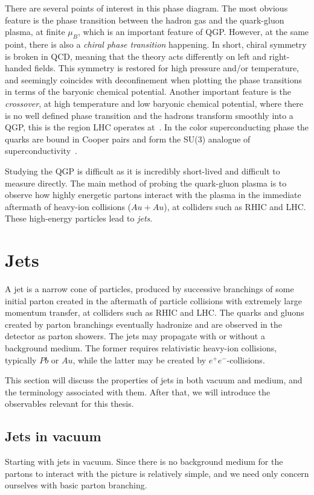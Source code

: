\documentclass[main.tex]{subfiles}
\begin{document}
There are several points of interest in this phase diagram. The most obvious feature is the phase transition between the hadron gas and the quark-gluon plasma, at finite \(\mu_B\), which is an important feature of QGP. However, at the same point, there is also a \emph{chiral phase transition} happening. In short, chiral symmetry is broken in QCD, meaning that the theory acts differently on left and right-handed fields. This symmetry is restored for high pressure and/or temperature, and seemingly coincides with deconfinement when plotting the phase transitions in terms of the baryonic chemical potential. Another important feature is the \emph{crossover}, at high temperature and low baryonic chemical potential, where there is no well defined phase transition and the hadrons transform smoothly into a QGP, this is the region LHC operates at~\cite{florkowski2010phenomenology}. In the color superconducting phase the quarks are bound in Cooper pairs and form the SU(3) analogue of superconductivity~\cite{Fischer_2019}.

Studying the QGP is difficult as it is incredibly short-lived and difficult to measure directly. The main method of probing the quark-gluon plasma is to observe how highly energetic partons interact with the plasma in the immediate aftermath of heavy-ion collisions (\(Au+Au\)), at colliders such as RHIC and LHC. These high-energy particles lead to \emph{jets}.

\section{Jets}
A jet is a narrow cone of particles, produced by successive branchings of some initial parton created in the aftermath of particle collisions with extremely large momentum transfer, at colliders such as RHIC and LHC. The quarks and gluons created by parton branchings eventually hadronize and are observed in the detector as parton showers. The jets may propagate with or without a background medium. The former requires relativistic heavy-ion collisions, typically \(Pb\) or \(Au\), while the latter may be created by \(e^+e^-\)-collisions.

This section will discuss the properties of jets in both vacuum and medium, and the terminology associated with them. After that, we will introduce the observables relevant for this thesis.

\subsection{Jets in vacuum}
Starting with jets in vacuum. Since there is no background medium for the partons to interact with the picture is relatively simple, and we need only concern ourselves with basic parton branching.
\end{document}
